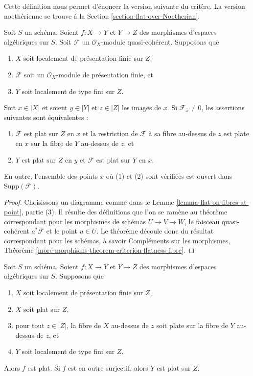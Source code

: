 \noindent
Cette définition nous permet d'énoncer la version suivante du critère.
La version noethérienne se trouve à la
Section \ref{section-flat-over-Noetherian}.

\begin{theorem}
\label{theorem-criterion-flatness-fibre}
Soit $S$ un schéma.
Soient $f : X \to Y$ et $Y \to Z$ des morphismes d'espaces algébriques sur $S$.
Soit $\mathcal{F}$ un $\mathcal{O}_X$-module quasi-cohérent.
Supposons que
\begin{enumerate}
\item $X$ soit localement de présentation finie sur $Z$,
\item $\mathcal{F}$ soit un $\mathcal{O}_X$-module de présentation finie, et
\item $Y$ soit localement de type fini sur $Z$.
\end{enumerate}
Soit $x \in |X|$ et soient $y \in |Y|$ et $z \in |Z|$ les images de
$x$. Si $\mathcal{F}_{\overline{x}} \not = 0$, les assertions suivantes sont
équivalentes :
\begin{enumerate}
\item $\mathcal{F}$ est plat sur $Z$ en $x$ et
la restriction de $\mathcal{F}$ à sa fibre au-dessus de $z$
est plate en $x$ sur la fibre de $Y$ au-dessus de $z$, et
\item $Y$ est plat sur $Z$ en $y$ et $\mathcal{F}$ est
plat sur $Y$ en $x$.
\end{enumerate}
En outre, l'ensemble des points $x$ où (1) et (2) sont vérifiées est ouvert dans
$\text{Supp}(\mathcal{F})$.
\end{theorem}

\begin{proof}
Choisissons un diagramme comme dans le
Lemme \ref{lemma-flat-on-fibres-at-point}, partie (3).
Il résulte des définitions que l'on se ramène au
théorème correspondant pour les morphismes de schémas
$U \to V \to W$, le faisceau quasi-cohérent $a^*\mathcal{F}$
et le point $u \in U$. Le théorème découle donc du
résultat correspondant pour les schémas, à savoir
Compléments sur les morphismes,
Théorème \ref{more-morphisms-theorem-criterion-flatness-fibre}.
\end{proof}

\begin{lemma}
\label{lemma-morphism-between-flat}
Soit $S$ un schéma.
Soient $f : X \to Y$ et $Y \to Z$ des morphismes d'espaces algébriques sur $S$.
Supposons que
\begin{enumerate}
\item $X$ soit localement de présentation finie sur $Z$,
\item $X$ soit plat sur $Z$,
\item pour tout $z \in |Z|$, la fibre de $X$ au-dessus de $z$
soit plate sur la fibre de $Y$ au-dessus de $z$, et
\item $Y$ soit localement de type fini sur $Z$.
\end{enumerate}
Alors $f$ est plat. Si $f$ est en outre surjectif, alors $Y$ est plat sur $Z$.
\end{lemma}

